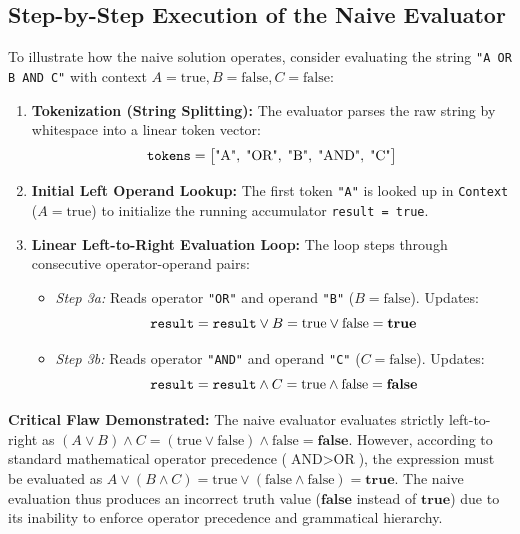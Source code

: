 \documentclass[12pt,a4paper]{article}
\begin{document}
\subsection{Step-by-Step Execution of the Naive Evaluator}
To illustrate how the naive solution operates, consider evaluating the string \texttt{"A OR B AND C"} with context $A=\text{true}, B=\text{false}, C=\text{false}$:
\begin{enumerate}
    \item \textbf{Tokenization (String Splitting):} The evaluator parses the raw string by whitespace into a linear token vector:
    \begin{equation*}
        \text{\texttt{tokens}} = \big[\text{"A"}, \; \text{"OR"}, \; \text{"B"}, \; \text{"AND"}, \; \text{"C"}\big]
    \end{equation*}
    \item \textbf{Initial Left Operand Lookup:} The first token \texttt{"A"} is looked up in \texttt{Context} ($A = \text{true}$) to initialize the running accumulator \texttt{result = true}.
    \item \textbf{Linear Left-to-Right Evaluation Loop:} The loop steps through consecutive operator-operand pairs:
    \begin{itemize}
        \item \textit{Step 3a:} Reads operator \texttt{"OR"} and operand \texttt{"B"} ($B = \text{false}$). Updates:
        \begin{equation*}
            \text{\texttt{result}} = \text{\texttt{result}} \lor B = \text{true} \lor \text{false} = \mathbf{true}
        \end{equation*}
        \item \textit{Step 3b:} Reads operator \texttt{"AND"} and operand \texttt{"C"} ($C = \text{false}$). Updates:
        \begin{equation*}
            \text{\texttt{result}} = \text{\texttt{result}} \land C = \text{true} \land \text{false} = \mathbf{false}
        \end{equation*}
    \end{itemize}
\end{enumerate}

\textbf{Critical Flaw Demonstrated:} The naive evaluator evaluates strictly left-to-right as $(A \lor B) \land C = (\text{true} \lor \text{false}) \land \text{false} = \mathbf{false}$. However, according to standard mathematical operator precedence ($\text{AND} > \text{OR}$), the expression must be evaluated as $A \lor (B \land C) = \text{true} \lor (\text{false} \land \text{false}) = \mathbf{true}$. The naive evaluation thus produces an incorrect truth value ($\mathbf{false}$ instead of $\mathbf{true}$) due to its inability to enforce operator precedence and grammatical hierarchy.
\end{document}
